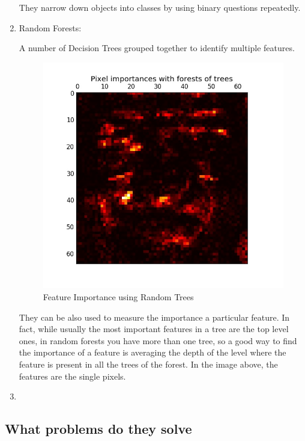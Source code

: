 \begin{enumerate}
		They narrow down objects into classes by using binary questions repeatedly.
	\item Random Forests:
		
		A number of Decision Trees grouped together to identify multiple features.
		\begin{figure}[H]
			\centering
			\includegraphics[scale=0.4]{images/featureimportance.jpg}
			\caption{Feature Importance using Random Trees}
			\label{f:featureimportance}
		\end{figure}
		They can be also used to measure the importance a particular feature. In fact, while usually the most important features in a tree are the top level ones, in random forests you have more than one tree, so a good way to find the importance of a feature is averaging the depth of the level where the feature is present in all the trees of the forest. In the image above, the features are the single pixels.
	\item 
\end{enumerate}




\subsection{What problems do they solve}\label{LearningTasks}



